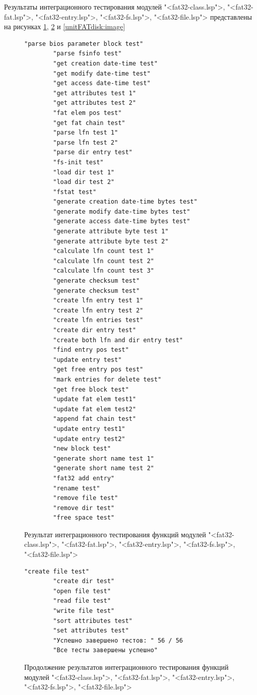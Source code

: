 Результаты интеграционного тестирования модулей "<fat32-class.lsp">, "<fat32-fat.lsp">, "<fat32-entry.lsp">, "<fat32-fs.lsp">, "<fat32-file.lsp"> представлены на рисунках \ref{unitFAT:image}, \ref{unitFAT2:image} и \ref{unitFATdisk:image}

\begin{figure}[H]
	\begin{lstlisting}[language={}]
		"parse bios parameter block test"
		"parse fsinfo test"
		"get creation date-time test"
		"get modify date-time test"
		"get access date-time test"
		"get attributes test 1"
		"get attributes test 2"
		"fat elem pos test"
		"get fat chain test"
		"parse lfn test 1"
		"parse lfn test 2"
		"parse dir entry test"
		"fs-init test"
		"load dir test 1"
		"load dir test 2"
		"fstat test"
		"generate creation date-time bytes test"
		"generate modify date-time bytes test"
		"generate access date-time bytes test"
		"generate attribute byte test 1"
		"generate attribute byte test 2"
		"calculate lfn count test 1"
		"calculate lfn count test 2"
		"calculate lfn count test 3"
		"generate checksum test"
		"generate checksum test"
		"create lfn entry test 1"
		"create lfn entry test 2"
		"create lfn entries test"
		"create dir entry test"
		"create both lfn and dir entry test"
		"find entry pos test"
		"update entry test"
		"get free entry pos test"
		"mark entries for delete test"
		"get free block test"
		"update fat elem test1"
		"update fat elem test2"
		"append fat chain test"
		"update entry test1"
		"update entry test2"
		"new block test"
		"generate short name test 1"
		"generate short name test 2"
		"fat32 add entry"
		"rename test"
		"remove file test"
		"remove dir test"
		"free space test"
	\end{lstlisting}  
	\caption{Результат интеграционного тестирования функций модулей "<fat32-class.lsp">, "<fat32-fat.lsp">, "<fat32-entry.lsp">, "<fat32-fs.lsp">, "<fat32-file.lsp">}
	\label{unitFAT:image}
\end{figure}

\begin{figure}[H]
	\begin{lstlisting}[language={}]
		"create file test"
		"create dir test"
		"open file test"
		"read file test"
		"write file test"
		"sort attributes test"
		"set attributes test"
		"Успешно завершено тестов: " 56 / 56
		"Все тесты завершены успешно"
	\end{lstlisting}  
	\caption{Продолжение результатов интеграционного тестирования функций модулей "<fat32-class.lsp">, "<fat32-fat.lsp">, "<fat32-entry.lsp">, "<fat32-fs.lsp">, "<fat32-file.lsp">}
	\label{unitFAT2:image}
\end{figure}

